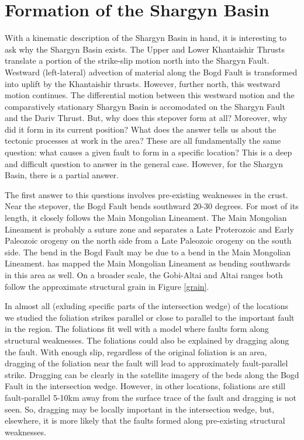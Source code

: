 \section{Formation of the Shargyn Basin}
	With a kinematic description of the Shargyn Basin in hand, it is interesting to ask why the Shargyn Basin exists. The Upper and Lower Khantaishir Thrusts translate a portion of the strike-slip motion north into the Shargyn Fault. Westward (left-lateral) advection of material along the Bogd Fault is transformed into uplift by the Khantaishir thrusts. However, further north, this westward motion continues. The differential motion between this westward motion and the comparatively stationary Shargyn Basin is accomodated on the Shargyn Fault and the Dariv Thrust. But, why does this stepover form at all? Moreover, why did it form in its current position? What does the answer tells us about the tectonic processes at work in the area? These are all fundamentally the same question: what causes a given fault to form in a specific location? This is a deep and difficult question to answer in the general case. However, for the Shargyn Basin, there is a partial answer.

	The first answer to this questions involves pre-existing weaknesses in the crust. Near the stepover, the Bogd Fault bends southward 20-30 degrees. For most of its length, it closely follows the Main Mongolian Lineament. The Main Mongolian Lineament is probably a suture zone and separates a Late Proterozoic and Early Paleozoic orogeny on the north side from a Late Paleozoic orogeny on the south side. The bend in the Bogd Fault may be due to a bend in the Main Mongolian Lineament. \citet{Windley2007} has mapped the Main Mongolian Lineament as bending southwards in this area as well. On a broader scale, the Gobi-Altai and Altai ranges both follow the approximate structural grain in Figure \ref{grain}.
	
	In almost all (exluding specific parts of the intersection wedge) of the locations we studied the foliation strikes parallel or close to parallel to the important fault in the region. The foliations fit well with a model where faults form along structural weaknesses. The foliations could also be explained by dragging along the fault. With enough slip, regardless of the original foliation is an area, dragging of the foliation near the fault will lead to approximately fault-parallel strike. Dragging can be clearly in the satellite imagery of the beds along the Bogd Fault in the intersection wedge. However, in other locations, foliations are still fault-parallel 5-10km away from the surface trace of the fault and dragging is not seen. So, dragging may be locally important in the intersection wedge, but, elsewhere, it is more likely that the faults formed along pre-existing structural weaknesses.


